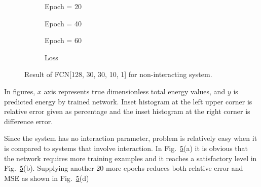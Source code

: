 \documentclass[a4paper,times,12pt]{article}
\begin{document}
\begin{figure}[H]
    \centering
    \begin{subfigure}[t]{0.45\textwidth}
        
        \caption{Epoch = 20}
		\label{fig:a}
    \end{subfigure}
    \begin{subfigure}[t]{0.45\textwidth}
        
        \caption{Epoch = 40}
		\label{fig:b}
    \end{subfigure}
    \begin{subfigure}[t]{0.45\textwidth}
        
        \caption{Epoch = 60}
		\label{fig:c}
    \end{subfigure}
    \begin{subfigure}[t]{0.45\textwidth}
        
        \caption{Loss}
		\label{fig:d}
    \end{subfigure}
    \caption{Result of FCN[128, 30, 30, 10, 1] for non-interacting system.}
\label{fig:FFN-g-0}
\end{figure}

In figures, $x$ axis represents true dimensionless total energy values, and $y$ is predicted energy by trained network. Inset histogram at the left upper corner is relative error given as percentage and the inset histogram at the right corner is difference error.

Since the system has no interaction parameter, problem is relatively easy when it is compared to systems that involve interaction. In Fig.~\ref{fig:FFN-g-0}(a) it is obvious that the network requires more training examples and it reaches a satisfactory level in Fig.~\ref{fig:FFN-g-0}(b). Supplying another 20 more epochs reduces both relative error and MSE as shown in Fig.~\ref{fig:FFN-g-0}(d)
\end{document}
